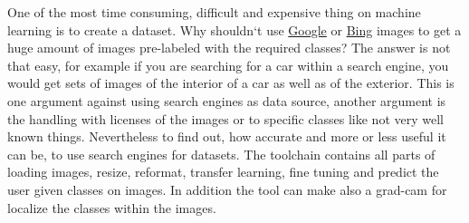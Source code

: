 \documentclass[../ImageClassifier.tex]{subfiles}
\begin{document}
    One of the most time consuming, difficult and expensive thing on machine learning is to create a dataset.
    Why shouldn`t use \href{https://www.google.de/imghp?hl=de&tab=wi&authuser=0&ogbl}{Google} or \href{https://www.bing.com}{Bing} images to get a huge amount of images pre-labeled with the required classes?
    The answer is not that easy, for example if you are searching for a car within a search engine, you would get sets of images of the interior of a car as well as of the exterior.
    This is one argument against using search engines as data source, another argument is the handling with licenses of the images or to specific classes like not very well known things.
    Nevertheless to find out, how accurate and more or less useful it can be, to use search engines for datasets.
    The toolchain contains all parts of loading images, resize, reformat, transfer learning, fine tuning and predict the user given classes on images.
    In addition the tool can make also a \ac{grad-cam} for localize the classes within the images.
\end{document}
